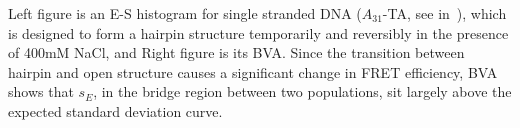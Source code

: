 \label{fig:bva_dynamic} Left figure is an E-S histogram for single stranded DNA ($A_{31}$-TA, see in~\cite{Tsukanov_2013}), which is designed to form a hairpin structure temporarily and reversibly in the presence of 400mM NaCl, and Right figure is its BVA. Since the transition between hairpin and open structure causes a significant change in FRET efficiency, BVA shows that $s_E$, in the bridge region between two populations, sit largely above the expected standard deviation curve.